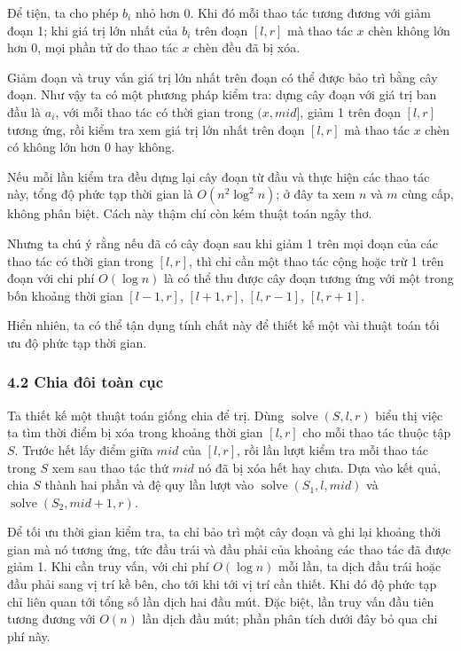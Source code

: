 \documentclass[11pt]{article}
\begin{document}
Để tiện, ta cho phép \(b_i\) nhỏ hơn 0. Khi đó mỗi thao tác tương đương với giảm
đoạn 1; khi giá trị lớn nhất của \(b_i\) trên đoạn \([l,r]\) mà thao tác \(x\)
chèn không lớn hơn 0, mọi phần tử do thao tác \(x\) chèn đều đã bị xóa.

Giảm đoạn và truy vấn giá trị lớn nhất trên đoạn có thể được bảo trì bằng cây
đoạn. Như vậy ta có một phương pháp kiểm tra: dựng cây đoạn với giá trị ban đầu
là \(a_i\), với mỗi thao tác có thời gian trong \((x,\mathit{mid}]\), giảm 1
trên đoạn \([l,r]\) tương ứng, rồi kiểm tra xem giá trị lớn nhất trên đoạn
\([l,r]\) mà thao tác \(x\) chèn có không lớn hơn 0 hay không.

Nếu mỗi lần kiểm tra đều dựng lại cây đoạn từ đầu và thực hiện các thao tác này,
tổng độ phức tạp thời gian là \(O(n^2\log^2 n)\); ở đây ta xem \(n\) và \(m\)
cùng cấp, không phân biệt. Cách này thậm chí còn kém thuật toán ngây thơ.

Nhưng ta chú ý rằng nếu đã có cây đoạn sau khi giảm 1 trên mọi đoạn của các thao
tác có thời gian trong \([l,r]\), thì chỉ cần một thao tác cộng hoặc trừ 1 trên
đoạn với chi phí \(O(\log n)\) là có thể thu được cây đoạn tương ứng với một
trong bốn khoảng thời gian \([l-1,r]\), \([l+1,r]\), \([l,r-1]\),
\([l,r+1]\).

Hiển nhiên, ta có thể tận dụng tính chất này để thiết kế một vài thuật toán tối
ưu độ phức tạp thời gian.

\subsubsection*{4.2 Chia đôi toàn cục}

Ta thiết kế một thuật toán giống chia để trị. Dùng
\(\operatorname{solve}(S,l,r)\) biểu thị việc ta tìm thời điểm bị xóa trong
khoảng thời gian \([l,r]\) cho mỗi thao tác thuộc tập \(S\). Trước hết lấy điểm
giữa \(\mathit{mid}\) của \([l,r]\), rồi lần lượt kiểm tra mỗi thao tác trong
\(S\) xem sau thao tác thứ \(\mathit{mid}\) nó đã bị xóa hết hay chưa. Dựa vào
kết quả, chia \(S\) thành hai phần và đệ quy lần lượt vào
\(\operatorname{solve}(S_1,l,\mathit{mid})\) và
\(\operatorname{solve}(S_2,\mathit{mid}+1,r)\).

Để tối ưu thời gian kiểm tra, ta chỉ bảo trì một cây đoạn và ghi lại khoảng thời
gian mà nó tương ứng, tức đầu trái và đầu phải của khoảng các thao tác đã được
giảm 1. Khi cần truy vấn, với chi phí \(O(\log n)\) mỗi lần, ta dịch đầu trái
hoặc đầu phải sang vị trí kề bên, cho tới khi tới vị trí cần thiết. Khi đó độ
phức tạp chỉ liên quan tới tổng số lần dịch hai đầu mút. Đặc biệt, lần truy vấn
đầu tiên tương đương với \(O(n)\) lần dịch đầu mút; phần phân tích dưới đây bỏ
qua chi phí này.
\end{document}
